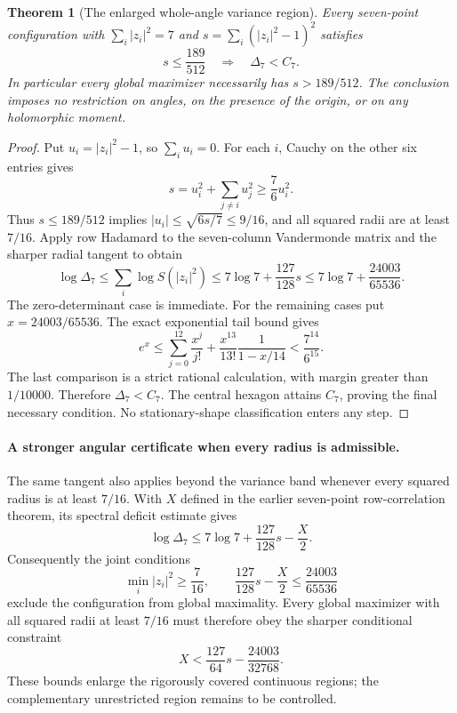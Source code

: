 \documentclass[11pt]{article}
\newtheorem{theorem}{Theorem}[section]
\theoremstyle{remark}
\numberwithin{equation}{section}
\begin{document}
\begin{theorem}[The enlarged whole-angle variance region]
\label{thm:noorigin-oct8-seven-radial-band}
Every seven-point configuration with $\sum_i|z_i|^2=7$ and
$s=\sum_i(|z_i|^2-1)^2$ satisfies
\[
             s\le\frac{189}{512}
           \quad\Longrightarrow\quad \Delta_7<C_7.
\]
In particular every global maximizer necessarily has
$s>189/512$. The conclusion imposes no restriction on angles,
on the presence of the origin, or on any holomorphic moment.
\end{theorem}
\begin{proof}
Put $u_i=|z_i|^2-1$, so $\sum_i u_i=0$.
For each $i$, Cauchy on the other six entries gives
\[
 s=u_i^2+\sum_{j\ne i}u_j^2\ge\frac76u_i^2.
\]
Thus $s\le189/512$ implies
$|u_i|\le\sqrt{6s/7}\le9/16$, and all squared radii are at
least $7/16$. Apply row Hadamard to the seven-column Vandermonde
matrix and the sharper radial tangent to obtain
\[
 \log\Delta_7\le\sum_i\log S(|z_i|^2)
       \le7\log7+\frac{127}{128}s
       \le7\log7+\frac{24003}{65536}.
\]
The zero-determinant case is immediate. For the remaining cases
put $x=24003/65536$. The exact exponential tail bound gives
\[
 e^x\le\sum_{j=0}^{12}\frac{x^j}{j!}
       +\frac{x^{13}}{13!}\frac1{1-x/14}
       <\frac{7^{14}}{6^{15}}.
\]
The last comparison is a strict rational calculation, with margin
greater than $1/10000$. Therefore $\Delta_7<C_7$.
The central hexagon attains $C_7$, proving the final necessary
condition. No stationary-shape classification enters any step.
\end{proof}

\paragraph{A stronger angular certificate when every radius is admissible.}
The same tangent also applies beyond the variance band whenever
every squared radius is at least $7/16$.
With $X$ defined in the earlier seven-point row-correlation theorem,
its spectral deficit estimate gives
\[
 \log\Delta_7\le7\log7+\frac{127}{128}s-\frac X2.
\]
Consequently the joint conditions
\[
 \min_i|z_i|^2\ge\frac7{16},\qquad
 \frac{127}{128}s-\frac X2\le\frac{24003}{65536}
\]
exclude the configuration from global maximality.
Every global maximizer with all squared radii at least $7/16$
must therefore obey the sharper conditional constraint
\[
                    X<\frac{127}{64}s-\frac{24003}{32768}.
\]
These bounds enlarge the rigorously covered continuous regions;
the complementary unrestricted region remains to be controlled.
\end{document}
